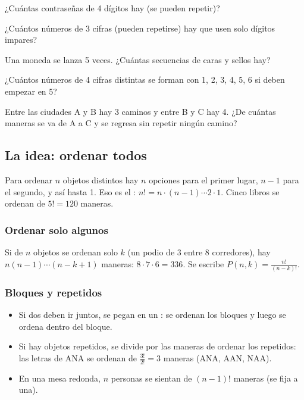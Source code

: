 \taller
{}
\begin{ejercicios}
\item ¿Cuántas contraseñas de 4 dígitos hay (se pueden repetir)? 
\item ¿Cuántos números de 3 cifras (pueden repetirse) hay que usen solo dígitos impares? 
\item Una moneda se lanza 5 veces. ¿Cuántas secuencias de caras y sellos hay? 
\end{ejercicios}
\begin{ejercicios}
\item ¿Cuántos números de 4 cifras distintas se forman con 1, 2, 3, 4, 5, 6 si deben empezar en 5?
\item Entre las ciudades A y B hay 3 caminos y entre B y C hay 4. ¿De cuántas maneras se va de A a C y se regresa sin repetir ningún camino?
\end{ejercicios}

\bitacora


\subsection{La idea: ordenar todos}
Para ordenar $n$ objetos distintos hay $n$ opciones para el primer lugar, $n - 1$ para el segundo, y así hasta 1. Eso es
el : $n! = n \cdot (n - 1) \cdots 2 \cdot 1$. Cinco libros se ordenan de $5! = 120$ maneras.

\subsubsection{Ordenar solo algunos}
Si de $n$ objetos se ordenan solo $k$ (un podio de 3 entre 8 corredores), hay $n(n-1)\cdots(n-k+1)$ maneras:
$8 \cdot 7 \cdot 6 = 336$. Se escribe $P(n, k) = \tfrac{n!}{(n-k)!}$.

\subsubsection{Bloques y repetidos}
\begin{itemize}
  \item Si dos deben ir juntos, se pegan en un : se ordenan los bloques y luego se ordena dentro del bloque.
  \item Si hay objetos repetidos, se divide por las maneras de ordenar los repetidos: las letras de ANA se ordenan de
  $\tfrac{3!}{2!} = 3$ maneras (ANA, AAN, NAA).
  \item En una mesa redonda, $n$ personas se sientan de $(n - 1)!$ maneras (se fija a una).
\end{itemize}

